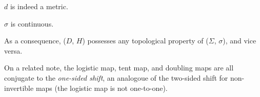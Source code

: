 \documentclass[12pt,twoside,draft]{book}
\begin{document}
\begin{proposition}
  $d$ is indeed a metric.
  \label{prop:symb-metric}
\end{proposition}
\begin{proposition}
  $\sigma$ is continuous.
  \label{prop:symb-sigma-cont}
\end{proposition}
As a consequence, ($D$, $H$) possesses any topological property of ($\Sigma$, $\sigma$), and vice versa.

On a related note, the logistic map, tent map, and doubling maps are all conjugate to the \textit{one-sided shift}, an analogoue of the two-sided shift for non-invertible maps (the logistic map is not one-to-one).




\printindex
\end{document}
